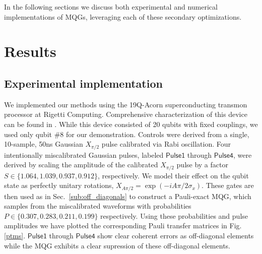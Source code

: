 \documentclass[aps,nofootinbib,pra,notitlepage,twocolumn]{revtex4-1}
\newcommand{\0}{\ensuremath{\mathbf{0}}}
\begin{document}
In the following sections we discuss both experimental and numerical implementations of MQGs, leveraging each of these secondary optimizations. 

\section{Results} %
\label{sec:results}


\subsection{Experimental implementation } %
\label{sub:experimental}
\noindent We implemented our methods using the 19Q-Acorn superconducting transmon processor at Rigetti Computing. Comprehensive characterization of this device can be found in \cite{1712.05771}. While this device consisted of 20 qubits with fixed couplings, we used only qubit \#8 for our demonstration. Controls were derived from a single, 10-sample, 50ns Gaussian $X_{\pi/2}$ pulse calibrated via Rabi oscillation. Four intentionally miscalibrated Gaussian pulses, labeled $\mathsf{Pulse1}$ through $\mathsf{Pulse4}$, were derived by scaling the amplitude of the calibrated $X_{\pi/2}$ pulse by a factor $S \in \{1.064, 1.039,0.937, 0.912\}$, respectively. We model their effect on the qubit state as perfectly unitary rotations, $X_{A \pi/2} = \exp{(-i A \pi/2 \sigma_x)}$. These gates are then used as in Sec.~\ref{sub:off_diagonals} to construct a Pauli-exact MQG, which samples from the miscalibrated waveforms with probabilities $P\in \{0.307, 0.283, 0.211, 0.199\}$ respectively. Using these probabilities and pulse amplitudes we have plotted the corresponding Pauli transfer matrices in Fig. \ref{ptms}. $\mathsf{Pulse1}$ through $\mathsf{Pulse4}$ show clear coherent errors as off-diagonal elements while the MQG exhibits a clear supression of these off-diagonal elements.
\end{document}
